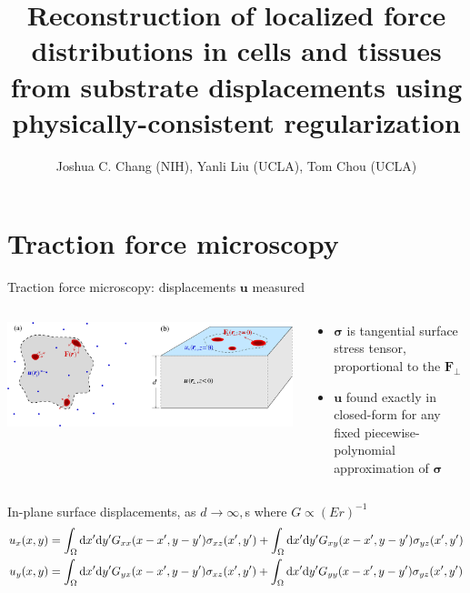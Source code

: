 \documentclass[presentation,aspectratio=169]{beamer}
\title[APS TFM talk] %
{Reconstruction of localized force distributions in cells and tissues from substrate displacements using physically-consistent regularization}
\author[Joshua C. Chang] {Joshua C. Chang (NIH), Yanli Liu (UCLA), Tom Chou (UCLA)}
\institute[NIH] %
{
}
\date[March 16, 2017] %
{
APS March Meeting 2017 \\
Session S5: Machine Learning for Modeling and Control of Biological Systems I

}
\newcommand{\dd}{\mathrm{d}}
\newcommand{\bsigma}{\boldsymbol\sigma}
\begin{document}
\section{Traction force microscopy}

\begin{frame}
  \titlepage
\end{frame}


\begin{frame}{Traction force microscopy: displacements $\mathbf{u}$ measured}
\begin{columns}
\begin{column}{0.65\textwidth}
\centering
\includegraphics[width=\textwidth]{figures/Fig1}
\end{column}
\begin{column}{0.35\textwidth}
\begin{itemize}
\item $\bsigma$ is tangential surface stress tensor, proportional to the $\mathbf{F}_\perp$
\item $\mathbf{u}$ found exactly in closed-form for any fixed piecewise-polynomial approximation of $\bsigma$
\end{itemize}
\end{column}
\end{columns}

\scriptsize

\begin{block}{In-plane surface displacements, as $d\to\infty,$s where $G \propto (Er)^{-1}$}
\vspace{-10pt}
\begin{align*}\tiny
u_{x}(x,y) &= \int_\Omega \dd x'\dd y'G_{xx}( x-x',y-y')\sigma_{xz}(x',y') 
 +  \int_\Omega \dd x'\dd y'G_{xy}( x-x',y-y')\sigma_{yz}(x',y')  \\
u_y(x,y) &= \int_\Omega \dd x'\dd y'G_{yx}( x-x',y-y')\sigma_{xz}(x',y') +  \int_\Omega \dd x'\dd y'G_{yy}( x-x',y-y')\sigma_{yz}(x',y') 
\end{align*}
\end{block}

\end{frame}
\end{document}
